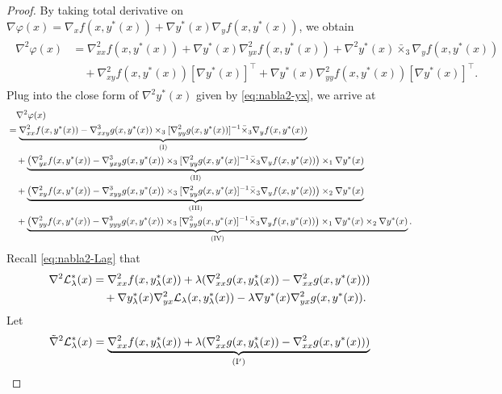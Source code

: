 \begin{proof}
    By taking total derivative on $ \nabla \varphi(x) = \nabla_x f(x,y^*(x)) + \nabla y^*(x) \nabla_y f(x,y^*(x))$, we obtain
    \begin{align} \label{eq:phi-hess}
\begin{split}
    \nabla^2 \varphi(x) &= \nabla_{xx}^2 f(x,y^*(x)) + \nabla y^*(x) \nabla_{yx}^2 f(x,y^*(x))  + \nabla^2 y^*(x) \bar \times_3 \nabla_y f(x,y^*(x)) \\
    &\quad + \nabla_{xy}^2f(x,y^*(x)) [\nabla y^*(x)]^\top + \nabla y^*(x) \nabla_{yy}^2 f(x,y^*(x)) [\nabla y^*(x)]^\top.
\end{split}
\end{align}
Plug into the close form of $\nabla^2 y^*(x)$ given by \eqref{eq:nabla2-yx}, we arrive at
    \begin{align*}
    &\quad \nabla^2 \varphi(x) \\
    &= \underbrace{\nabla_{xx }^2  f(x,y^*(x)) - \nabla_{xxy}^3 g(x,y^*(x)) \times_3 [  \nabla_{yy}^2 g(x,y^*(x))]^{-1} \bar \times_3 \nabla_y f(x,y^*(x)) }_{\rm (I)} \\
    &\quad +  
    \underbrace{  \left(\nabla_{yx}^2 f(x,y^*(x)) - \nabla_{yxy}^3 g(x,y^*(x)) \times_3 [\nabla_{yy}^2 g(x,y^*(x)]^{-1}  \bar \times_3 \nabla_y f(x,y^*(x)) \right) \times_1 \nabla y^*(x)  }_{\rm (II)}  \\
    &\quad +  
    \underbrace{  \left(\nabla_{xy}^2 f(x,y^*(x)) - \nabla_{xyy}^3 g(x,y^*(x)) \times_3 [\nabla_{yy}^2 g(x,y^*(x)]^{-1}  \bar \times_3 \nabla_y f(x,y^*(x)) \right) \times_2 \nabla y^*(x)  }_{\rm (III)}  \\
    &\quad + \underbrace{  \left( \nabla_{yy}^2 f(x,y^*(x)) -  \nabla_{yyy}^3 g(x,y^*(x)) \times_3 [\nabla_{yy}^2 g(x,y^*(x)]^{-1} \bar \times_3 \nabla_y f(x,y^*(x))   \right) \times_1 \nabla y^*(x) \times_2 \nabla y^*(x) }_{\rm (IV)}. 
\end{align*}
Recall \eqref{eq:nabla2-Lag} that
\begin{align*}
    \nabla^2 {\mathcal{L}}_{\lambda}^*(x) &= \nabla_{xx}^2  f(x,y_{\lambda}^*(x)) +  \lambda ( \nabla_{xx}^2 g(x,y_{\lambda}^*(x)) - \nabla_{xx}^2 g(x,y^*(x))) \\
    &\quad + \nabla y_{\lambda}^*(x) \nabla_{yx}^2 {\mathcal{L}}_{\lambda}(x,y_{\lambda}^*(x))
    - \lambda \nabla y^*(x) \nabla_{yx}^2 g(x,y^*(x)) .
\end{align*}
Let
\begin{align*}
    \tilde \nabla^2 \fL_{\lambda}^*(x) &= \underbrace{\nabla_{xx}^2  f(x,y_{\lambda}^*(x)) +  \lambda ( \nabla_{xx}^2 g(x,y_{\lambda}^*(x)) - \nabla_{xx}^2 g(x,y^*(x)))}_{\rm (I')}\\

\end{align*}
\end{proof}
